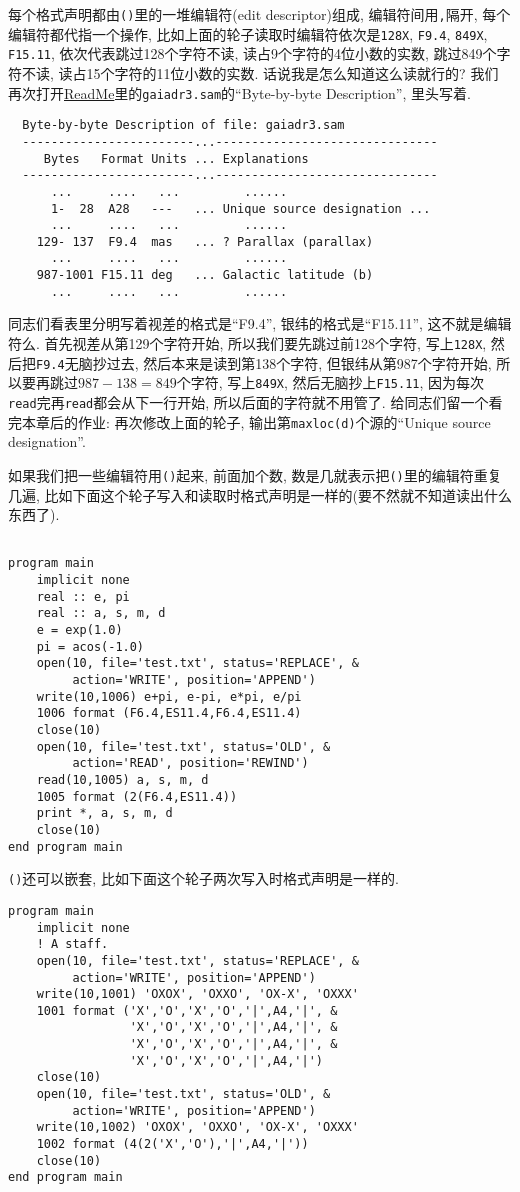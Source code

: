 每个格式声明都由\verb|()|里的一堆编辑符(edit descriptor)组成, 编辑符间用\verb|,|隔开, 每个编辑符都代指一个操作, 比如上面的轮子读取时编辑符依次是\verb|128X|, \verb|F9.4|, \verb|849X|, \verb|F15.11|, 依次代表跳过128个字符不读, 读占9个字符的4位小数的实数, 跳过849个字符不读, 读占15个字符的11位小数的实数. 话说我是怎么知道这么读就行的? 我们再次打开\href{https://cdsarc.cds.unistra.fr/viz-bin/ReadMe/I/355?format=html&tex=true}{ReadMe}里的\verb|gaiadr3.sam|的``Byte-by-byte Description'', 里头写着.
\begin{verbatim}
  Byte-by-byte Description of file: gaiadr3.sam
  ------------------------...-------------------------------
     Bytes   Format Units ... Explanations
  ------------------------...-------------------------------
      ...     ....   ...         ......
      1-  28  A28   ---   ... Unique source designation ...
      ...     ....   ...         ......
    129- 137  F9.4  mas   ... ? Parallax (parallax)
      ...     ....   ...         ......
    987-1001 F15.11 deg   ... Galactic latitude (b)
      ...     ....   ...         ......
\end{verbatim}
同志们看表里分明写着视差的格式是``F9.4'', 银纬的格式是``F15.11'', 这不就是编辑符么. 首先视差从第129个字符开始, 所以我们要先跳过前128个字符, 写上\verb|128X|, 然后把\verb|F9.4|无脑抄过去, 然后本来是读到第138个字符, 但银纬从第987个字符开始, 所以要再跳过$987-138=849$个字符, 写上\verb|849X|, 然后无脑抄上\verb|F15.11|, 因为每次\verb|read|完再\verb|read|都会从下一行开始, 所以后面的字符就不用管了. 给同志们留一个看完本章后的作业: 再次修改上面的轮子, 输出第\verb|maxloc(d)|个源的``Unique source designation''.

如果我们把一些编辑符用\verb|()|起来, 前面加个数, 数是几就表示把\verb|()|里的编辑符重复几遍, 比如下面这个轮子写入和读取时格式声明是一样的(要不然就不知道读出什么东西了).
\begin{verbatim}

program main
    implicit none
    real :: e, pi
    real :: a, s, m, d
    e = exp(1.0)
    pi = acos(-1.0)
    open(10, file='test.txt', status='REPLACE', &
         action='WRITE', position='APPEND')
    write(10,1006) e+pi, e-pi, e*pi, e/pi
    1006 format (F6.4,ES11.4,F6.4,ES11.4)
    close(10)
    open(10, file='test.txt', status='OLD', &
         action='READ', position='REWIND')
    read(10,1005) a, s, m, d
    1005 format (2(F6.4,ES11.4))
    print *, a, s, m, d
    close(10)
end program main
\end{verbatim}
\verb|()|还可以嵌套, 比如下面这个轮子两次写入时格式声明是一样的.
\begin{verbatim}
program main
    implicit none
    ! A staff.
    open(10, file='test.txt', status='REPLACE', &
         action='WRITE', position='APPEND')
    write(10,1001) 'OXOX', 'OXXO', 'OX-X', 'OXXX'
    1001 format ('X','O','X','O','|',A4,'|', &
                 'X','O','X','O','|',A4,'|', &
                 'X','O','X','O','|',A4,'|', &
                 'X','O','X','O','|',A4,'|')
    close(10)
    open(10, file='test.txt', status='OLD', &
         action='WRITE', position='APPEND')
    write(10,1002) 'OXOX', 'OXXO', 'OX-X', 'OXXX'
    1002 format (4(2('X','O'),'|',A4,'|'))
    close(10)
end program main
\end{verbatim}

